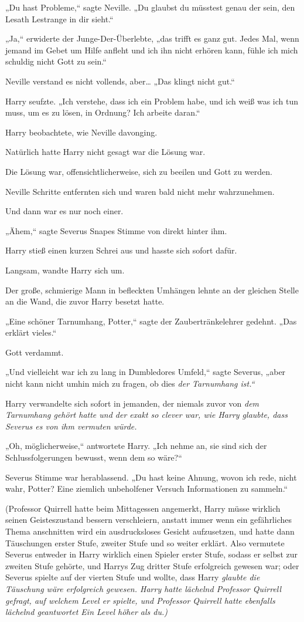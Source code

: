 {„Du hast Probleme,“ sagte Neville. „Du glaubst du müsstest genau der sein, den Lesath Lestrange in dir sieht.“

„Ja,“ erwiderte der Junge-Der-Überlebte, „das trifft es ganz gut. Jedes Mal, wenn jemand im Gebet um Hilfe anfleht und ich ihn nicht erhören kann, fühle ich mich schuldig nicht Gott zu sein.“

Neville verstand es nicht vollends, aber… „Das klingt nicht gut.“

Harry seufzte. „Ich verstehe, dass ich ein Problem habe, und ich weiß was ich tun muss, um es zu lösen, in Ordnung? Ich arbeite daran.“

Harry beobachtete, wie Neville davonging.

Natürlich hatte Harry nicht gesagt war die Lösung war.

Die Lösung war, offensichtlicherweise, sich zu beeilen und Gott zu werden.

Neville Schritte entfernten sich und waren bald nicht mehr wahrzunehmen.

Und dann war es nur noch einer.

„Ähem,“ sagte Severus Snapes Stimme von direkt hinter ihm.

Harry stieß einen kurzen Schrei aus und hasste sich sofort dafür.

Langsam, wandte Harry sich um.

Der große, schmierige Mann in befleckten Umhängen lehnte an der gleichen Stelle an die Wand, die zuvor Harry besetzt hatte.

„Eine schöner Tarnumhang, Potter,“ sagte der Zaubertränkelehrer gedehnt. „Das erklärt vieles.“

Gott verdammt.

„Und vielleicht war ich zu lang in Dumbledores Umfeld,“ sagte Severus, „aber nicht kann nicht umhin mich zu fragen, ob dies \emph{der Tarnumhang ist.“}

Harry verwandelte sich sofort in jemanden, der niemals zuvor von \emph{dem Tarnumhang gehört hatte und der \emph{exakt} so clever war, wie Harry glaubte, dass Severus es von ihm vermuten würde.}

„Oh, möglicherweise,“ antwortete Harry. „Ich nehme an, sie sind sich der Schlussfolgerungen bewusst, wenn dem so wäre?“

Severus Stimme war herablassend. „Du hast keine Ahnung, wovon ich rede, nicht wahr, Potter? Eine ziemlich unbeholfener Versuch Informationen zu sammeln.“

(Professor Quirrell hatte beim Mittagessen angemerkt, Harry müsse wirklich seinen Geisteszustand bessern verschleiern, anstatt immer wenn ein gefährliches Thema anschnitten wird ein ausdrucksloses Gesicht aufzusetzen, und hatte dann Täuschungen erster Stufe, zweiter Stufe und so weiter erklärt. Also vermutete Severus entweder in Harry wirklich einen Spieler erster Stufe, sodass er selbst zur zweiten Stufe gehörte, und Harrys Zug dritter Stufe erfolgreich gewesen war; oder Severus spielte auf der vierten Stufe und wollte, dass Harry \emph{glaubte die Täuschung wäre erfolgreich gewesen. Harry hatte lächelnd Professor Quirrell gefragt, auf welchem Level er spielte, und Professor Quirrell hatte ebenfalls lächelnd geantwortet \emph{Ein Level höher als du.})}

}

